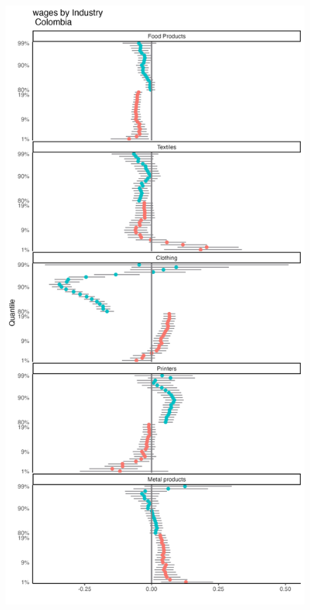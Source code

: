 \documentclass[
  12pt]{article}
\theoremstyle{definition}
\theoremstyle{remark}
\begin{document}
\begin{figure}

{\centering \includegraphics[width=\textwidth,height=1\textheight]{../Results/Figures/Colombia/wages_by_inds_diff.png}

}

\end{figure}


  
\end{document}
